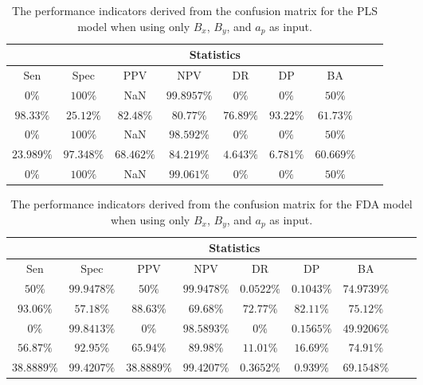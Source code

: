 \begin{table}[!ht]
	\centering
	\begin{tabular}{|c|c|c|c|c|c|c|c|c|}
		\hline
		 & \multicolumn{7}{c|}{Statistics} \\ \hline
		Sen & Spec & PPV & NPV & DR & DP & BA \\ \hline
		$0\%$ & $100\%$ & NaN & $99.8957\%$ & $0\%$ & $0\%$ & $50\%$ \\ \hline
		$98.33\%$ & $25.12\%$ & $82.48\%$ & $80.77\%$ & $76.89\%$ & $93.22\%$ & $61.73\%$ \\ \hline
		$0\%$ & $100\%$ & NaN & $98.592\%$ & $0\%$ & $0\%$ & $50\%$ \\ \hline
		$23.989\%$ & $97.348\%$ & $68.462\%$ & $84.219\%$ & $4.643\%$ & $6.781\%$ & $60.669\%$ \\ \hline
		$0\%$ & $100\%$ & NaN & $99.061\%$ & $0\%$ & $0\%$ & $50\%$ \\ \hline
	\end{tabular}
	\caption{The performance indicators derived from the confusion matrix for the PLS model when using only $B_{x}$, $B_{y}$, and $a_{p}$ as input.}
	\label{tab:cs:xyap:pls}
\end{table}

\begin{table}[!ht]
	\centering
	\begin{tabular}{|c|c|c|c|c|c|c|c|c|}
		\hline
		 & \multicolumn{7}{c|}{Statistics} \\ \hline
		Sen & Spec & PPV & NPV & DR & DP & BA \\ \hline
		$50\%$ & $99.9478\%$ & $50\%$ & $99.9478\%$ & $0.0522\%$ & $0.1043\%$ & $74.9739\%$ \\ \hline
		$93.06\%$ & $57.18\%$ & $88.63\%$ & $69.68\%$ & $72.77\%$ & $82.11\%$ & $75.12\%$ \\ \hline
		$0\%$ & $99.8413\%$ & $0\%$ & $98.5893\%$ & $0\%$ & $0.1565\%$ & $49.9206\%$ \\ \hline
		$56.87\%$ & $92.95\%$ & $65.94\%$ & $89.98\%$ & $11.01\%$ & $16.69\%$ & $74.91\%$ \\ \hline
		$38.8889\%$ & $99.4207\%$ & $38.8889\%$ & $99.4207\%$ & $0.3652\%$ & $0.939\%$ & $69.1548\%$ \\ \hline
	\end{tabular}
	\caption{The performance indicators derived from the confusion matrix for the FDA model when using only $B_{x}$, $B_{y}$, and $a_{p}$ as input.}
	\label{tab:cs:xyap:fda}
\end{table}

